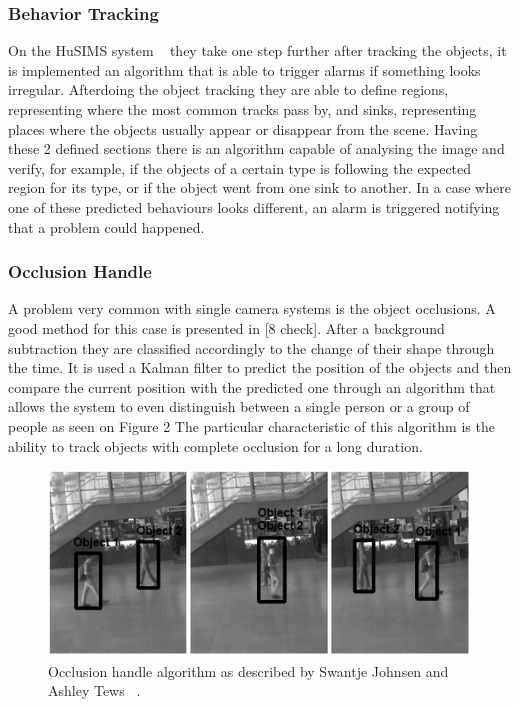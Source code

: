 \documentclass[journal,transmag]{IEEEtran}
\begin{document}
\subsubsection{Behavior Tracking}
On the HuSIMS system ~\cite{HuSIMS} they take one step further after tracking the objects, it is implemented an algorithm that is able to trigger alarms if something looks
irregular. Afterdoing the object tracking they are able to define regions, representing where the most common tracks pass by, and sinks, representing places where the objects
usually appear or disappear from the scene. Having these 2 defined sections there is an algorithm capable of analysing the image and verify, for example, if the objects of a
certain type is following the expected region for its type, or if the object went from one sink to another. In a case where one of these predicted behaviours looks different,
an alarm is triggered notifying that a problem could happened.

\subsubsection{Occlusion Handle}
A problem very common with single camera systems is the object occlusions. A good method for this case is presented in [8 check]. After a background subtraction they are 
classified accordingly to the change of their shape through the time. It is used a Kalman filter to predict the position of the objects and then compare the current position
with the predicted one through an algorithm that allows the system to even distinguish between a single person or a group of people as seen on Figure 2 The particular 
characteristic of this algorithm is the ability to track objects with complete occlusion for a long duration.

\begin{figure}[h!]
\centering
\includegraphics[scale=0.5]{Occlusion.png}
\caption{Occlusion handle algorithm as described by Swantje Johnsen and Ashley Tews ~\cite{Occlusion}.}
\end{figure}	
\end{document}
